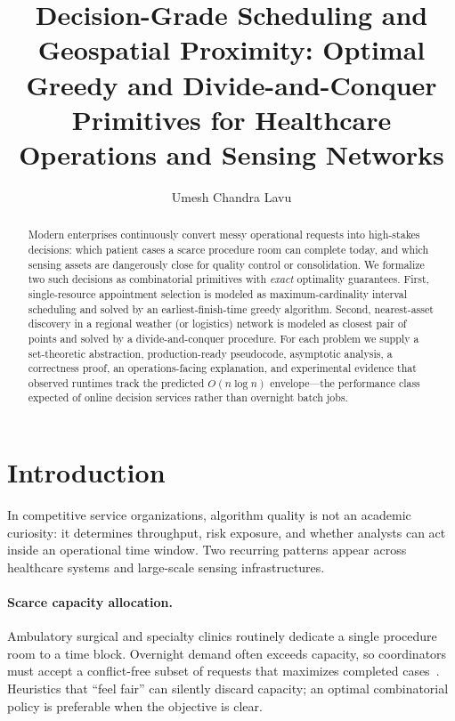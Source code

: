 \documentclass[sigconf,review=false]{acmart}
\title{Decision-Grade Scheduling and Geospatial Proximity:
Optimal Greedy and Divide-and-Conquer Primitives for
Healthcare Operations and Sensing Networks}
\author{Umesh Chandra Lavu}
\affiliation{%
  \institution{University of Florida}
  \department{Department of Computer \& Information Science \& Engineering}
  \city{Gainesville}
  \state{FL}
  \country{USA}
}
\theoremstyle{definition}
\begin{document}
\begin{abstract}
Modern enterprises continuously convert messy operational requests into
high-stakes decisions: which patient cases a scarce procedure room can
complete today, and which sensing assets are dangerously close for
quality control or consolidation. We formalize two such decisions as
combinatorial primitives with \emph{exact} optimality guarantees.
First, single-resource appointment selection is modeled as
maximum-cardinality interval scheduling and solved by an
earliest-finish-time greedy algorithm. Second, nearest-asset discovery
in a regional weather (or logistics) network is modeled as closest pair
of points and solved by a divide-and-conquer procedure. For each problem
we supply a set-theoretic abstraction, production-ready pseudocode,
asymptotic analysis, a correctness proof, an operations-facing
explanation, and experimental evidence that observed runtimes track the
predicted $O(n\log n)$ envelope---the performance class expected of
online decision services rather than overnight batch jobs.
\end{abstract}


\maketitle

\section{Introduction}
\label{sec:intro}

In competitive service organizations, algorithm quality is not an academic
curiosity: it determines throughput, risk exposure, and whether analysts
can act inside an operational time window. Two recurring patterns appear
across healthcare systems and large-scale sensing infrastructures.

\paragraph{Scarce capacity allocation.}
Ambulatory surgical and specialty clinics routinely dedicate a single
procedure room to a time block. Overnight demand often exceeds capacity,
so coordinators must accept a conflict-free subset of requests that
maximizes completed cases~\cite{gupta2015or,cayirli2003}. Heuristics that
``feel fair'' can silently discard capacity; an optimal combinatorial
policy is preferable when the objective is clear.
\end{document}
